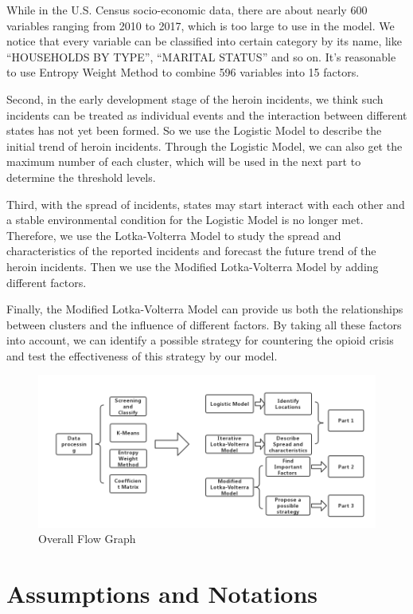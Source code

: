 \documentclass[12pt]{article}
\begin{document}
While in the U.S. Census socio-economic data, there are about nearly 600 variables ranging from 2010 to 2017, which is too large to use in the model. We notice that every variable can be classified into certain category by its name, like “HOUSEHOLDS BY TYPE”, “MARITAL STATUS” and so on. It's reasonable to use Entropy Weight Method to combine 596 variables into 15 factors.

Second, in the early development stage of the heroin incidents, we think such incidents can be treated as individual events and the interaction between different states has not yet been formed. So we use the Logistic Model to describe the initial trend of heroin incidents. Through the Logistic Model, we can also get the maximum number of each cluster, which will be used in the next part to determine the threshold levels.

Third, with the spread of incidents, states may start interact with each other and a stable environmental condition for the Logistic Model is no longer met. Therefore, we use the Lotka-Volterra Model to study the spread and characteristics of the reported incidents and forecast the future trend of the heroin incidents. Then we use the Modified Lotka-Volterra Model by adding different factors.

Finally, the Modified Lotka-Volterra Model can provide us both the relationships between clusters and the influence of different factors. By taking all these factors into account, we can identify a possible strategy for countering the opioid crisis and test the effectiveness of this strategy by our model.

\begin{figure}[H]
	\centering
	\includegraphics[scale=0.4]{./figures/18.png}
	\caption{Overall Flow Graph}
	\label{Fig18}
\end{figure}

\section{Assumptions and Notations}
\end{document}
